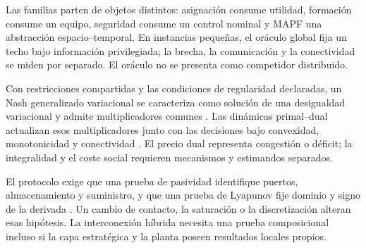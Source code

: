 Las familias parten de objetos distintos: asignación consume utilidad, formación
consume un equipo, seguridad consume un control nominal y MAPF una abstracción
espacio--temporal. En instancias pequeñas, el oráculo global fija un techo bajo
información privilegiada; la brecha, la comunicación y la conectividad se miden
por separado. El oráculo no se presenta como competidor distribuido.

Con restricciones compartidas y las condiciones de regularidad declaradas, un
Nash generalizado variacional se caracteriza como solución de una desigualdad
variacional y admite multiplicadores comunes
\parencite{yi2019operatorGNE,franci2022stochasticGNE}. Las dinámicas
primal--dual actualizan esos multiplicadores junto con las decisiones bajo
convexidad, monotonicidad y conectividad
\parencite{cherukuri2016primalDual,koshal2016aggregative}. El precio dual
representa congestión o déficit; la integralidad y el coste social requieren
mecanismos y estimandos separados.

El protocolo exige que una prueba de pasividad identifique puertos,
almacenamiento y suministro, y que una prueba de Lyapunov fije dominio y signo
de la derivada \parencite{vanderschaf2017passivity,ortega2002passivity}. Un
cambio de contacto, la saturación o la discretización alteran esas hipótesis.
La interconexión híbrida necesita una prueba composicional incluso si la capa
estratégica y la planta poseen resultados locales propios.
